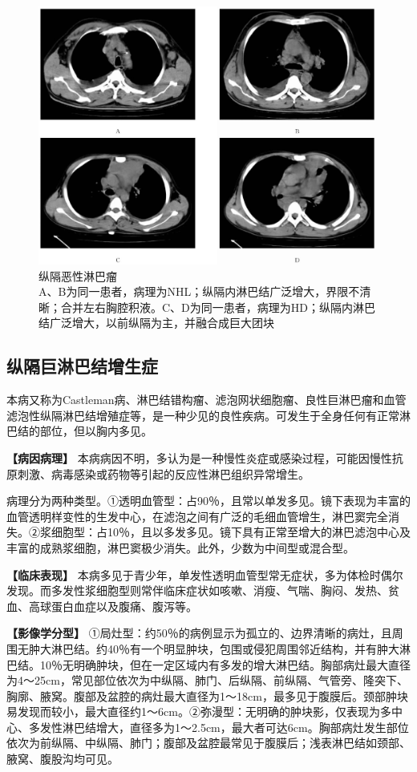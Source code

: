 \begin{figure}[!htbp]
 \centering
 \includegraphics[width=.7\textwidth,height=\textheight,keepaspectratio]{./images/Image00258.jpg}
 \captionsetup{justification=centering}
 \caption{纵隔恶性淋巴瘤\\{\small A、B为同一患者，病理为NHL；纵隔内淋巴结广泛增大，界限不清晰；合并左右胸腔积液。C、D为同一患者，病理为HD；纵隔内淋巴结广泛增大，以前纵隔为主，并融合成巨大团块}}
 \label{fig9-55}
  \end{figure} 

\subsection{纵隔巨淋巴结增生症}

本病又称为Castleman病、淋巴结错构瘤、滤泡网状细胞瘤、良性巨淋巴瘤和血管滤泡性纵隔淋巴结增殖症等，是一种少见的良性疾病。可发生于全身任何有正常淋巴结的部位，但以胸内多见。

\textbf{【病因病理】}
本病病因不明，多认为是一种慢性炎症或感染过程，可能因慢性抗原刺激、病毒感染或药物等引起的反应性淋巴组织异常增生。

病理分为两种类型。①透明血管型：占90％，且常以单发多见。镜下表现为丰富的血管透明样变性的生发中心，在滤泡之间有广泛的毛细血管增生，淋巴窦完全消失。②浆细胞型：占10％，且以多发多见。镜下具有正常至增大的淋巴滤泡中心及丰富的成熟浆细胞，淋巴窦极少消失。此外，少数为中间型或混合型。

\textbf{【临床表现】}
本病多见于青少年，单发性透明血管型常无症状，多为体检时偶尔发现。而多发性浆细胞型则常伴临床症状如咳嗽、消瘦、气喘、胸闷、发热、贫血、高球蛋白血症以及腹痛、腹泻等。

\textbf{【影像学分型】}
①局灶型：约50％的病例显示为孤立的、边界清晰的病灶，且周围无肿大淋巴结。约40％有一个明显肿块，包围或侵犯周围邻近结构，并有肿大淋巴结。10％无明确肿块，但在一定区域内有多发的增大淋巴结。胸部病灶最大直径为4～25cm，常见部位依次为中纵隔、肺门、后纵隔、前纵隔、气管旁、隆突下、胸廓、腋窝。腹部及盆腔的病灶最大直径为1～18cm，最多见于腹膜后。颈部肿块易发现而较小，最大直径约1～6cm。②弥漫型：无明确的肿块影，仅表现为多中心、多发性淋巴结增大，直径多为1～2.5cm，最大者可达6cm。胸部病灶发生部位依次为前纵隔、中纵隔、肺门；腹部及盆腔最常见于腹膜后；浅表淋巴结如颈部、腋窝、腹股沟均可见。

